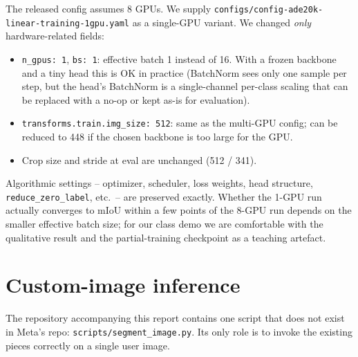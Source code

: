 \documentclass[11pt,a4paper]{article}
\begin{document}
The released config assumes 8 GPUs. We supply
\texttt{configs/config-ade20k-linear-training-1gpu.yaml} as a single-GPU
variant. We changed \emph{only} hardware-related fields:
\begin{itemize}[leftmargin=1.6em,itemsep=0pt]
  \item \texttt{n\_gpus: 1}, \texttt{bs: 1}: effective batch 1 instead of
        16. With a frozen backbone and a tiny head this is OK in practice
        (BatchNorm sees only one sample per step, but the head's
        BatchNorm is a single-channel per-class scaling that can be
        replaced with a no-op or kept as-is for evaluation).
  \item \texttt{transforms.train.img\_size: 512}: same as the multi-GPU
        config; can be reduced to 448 if the chosen backbone is too
        large for the GPU.
  \item Crop size and stride at eval are unchanged (512 / 341).
\end{itemize}
Algorithmic settings -- optimizer, scheduler, loss weights, head structure,
\texttt{reduce\_zero\_label}, etc.\ -- are preserved exactly. Whether the
1-GPU run actually converges to mIoU within a few points of the 8-GPU run
depends on the smaller effective batch size; for our class demo we are
comfortable with the qualitative result and the partial-training
checkpoint as a teaching artefact.

\section{Custom-image inference}
\label{sec:script}

The repository accompanying this report contains one script that does not
exist in Meta's repo: \texttt{scripts/segment\_image.py}. Its only role is
to invoke the existing pieces correctly on a single user image.
\end{document}
